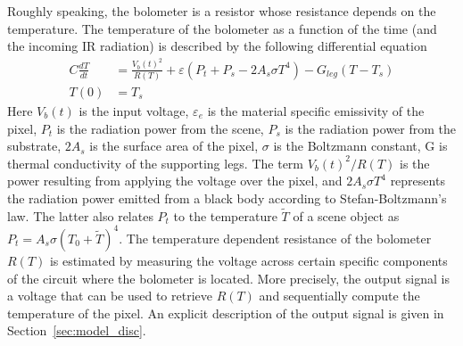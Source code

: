

Roughly speaking, the bolometer is a resistor whose resistance depends on the temperature.
The temperature of the bolometer as a function of the time (and the incoming IR radiation) is described by the following differential equation
\begin{align} \label{eq:heat_balance_equation}
 C\frac{dT}{dt}&=\frac{V_b(t)^2}{R(T)}+\varepsilon(P_t+P_s -2A_s \sigma T^4)-G_{leg}(T-T_s) \\
 T(0)&=T_s	\nonumber
\end{align}
Here $V_b(t)$ is the input voltage, $\varepsilon_e$ is the material specific emissivity of the pixel, $P_t$ is the radiation power from the scene, $P_s$ is the radiation power from the substrate, $2A_s$ is the surface area of the pixel, $\sigma$ is the Boltzmann constant, G is thermal conductivity of the supporting legs. The term $V_b(t)^2/R(T)$ is the power resulting from applying the voltage over the pixel, and $2A_s \sigma T^4$ represents the radiation power emitted from a black body according to Stefan-Boltzmann's law. The latter also relates $P_t$ to the temperature $\tilde T$ of a scene object as $P_t = A_s \sigma (T_0+\tilde T)^4$.
The temperature dependent resistance of the bolometer $R(T)$ is estimated by measuring the voltage across certain specific components of the circuit where the bolometer is located. More precisely, the output signal is a voltage that can be used to retrieve $R(T)$ and sequentially compute the temperature of the pixel. An explicit description of the output signal is given in Section~\ref{sec:model_disc}.



